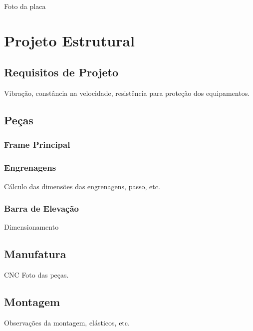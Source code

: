 Foto da placa

\section{Projeto Estrutural}

\subsection{Requisitos de Projeto}
Vibração, constância na velocidade, resistência para proteção dos equipamentos.

\subsection{Peças}
\subsubsection{Frame Principal}

\subsubsection{Engrenagens}
Cálculo das dimensões das engrenagens, passo, etc.

\subsubsection{Barra de Elevação}
Dimensionamento

\subsection{Manufatura}
CNC
Foto das peças.

\subsection{Montagem}
Observações da montagem, elásticos, etc.

